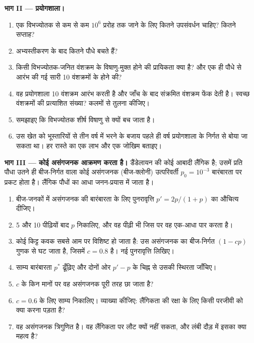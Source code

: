 \begin{problem}
\medskip
\noindent\textbf{भाग II --- प्रयोगशाला।}
\begin{enumerate}[resume]
  \item एक विभज्योतक से कम से कम $10^{6}$ प्ररोह तक जाने के लिए कितने
        उपसंवर्धन चाहिए? कितने सप्ताह?
  \item अभ्यस्तीकरण के बाद कितने पौधे बचते हैं?
  \item किसी विभज्योतक-जनित वंशक्रम के विषाणु-मुक्त होने की प्रायिकता
        क्या है? और एक ही पौधे से आरंभ की गई सारी \num{10} वंशक्रमों के
        होने की?
  \item वह प्रयोगशाला \num{10} वंशक्रम आरंभ करती है और जाँच के बाद
        संक्रमित वंशक्रम फेंक देती है। स्वच्छ वंशक्रमों की प्रत्याशित
        संख्या? कलमों से तुलना कीजिए।
  \item समझाइए कि विभज्योतक शीर्ष विषाणु से क्यों बच जाता है।
  \item उस खेत को भूस्तारियों से तीन वर्ष में भरने के बजाय पहले ही वर्ष
        प्रयोगशाला के निर्गत से बोया जा सकता था। हर रास्ते का एक लाभ
        और एक जोखिम बताइए।
\end{enumerate}

\medskip
\noindent\textbf{भाग III --- कोई असंगजनक आक्रमण करता है।}
डैंडेलायन की कोई आबादी लैंगिक है; उसमें प्रति पौधा उतने ही बीज-निर्गत
वाला कोई असंगजनक (बीज-क्लोनी) उत्परिवर्ती $p_0 = 10^{-3}$ बारंबारता पर
प्रकट होता है। लैंगिक पौधों का आधा जनन-प्रयास
 में जाता है।
\begin{enumerate}[resume]
  \item बीज-जनकों में असंगजनक की बारंबारता के लिए पुनरावृत्ति
        $p' = 2p/(1 + p)$ का औचित्य दीजिए।
  \item 5 और 10 पीढ़ियों बाद $p$ निकालिए, और वह पीढ़ी भी जिस पर वह
        एक-आधा पार करता है।
  \item कोई किट्ट कवक सबसे आम  पर विशिष्ट हो जाता है: उस
        असंगजनक का बीज-निर्गत $(1 - cp)$ गुणक से घट जाता है, जिसमें
        $c = 0.8$ है। नई पुनरावृत्ति लिखिए।
  \item साम्य बारंबारता $p^*$ ढूँढ़िए और दोनों ओर $p' - p$ के चिह्न से
        उसकी स्थिरता जाँचिए।
  \item $c$ के किन मानों पर वह असंगजनक पूरी तरह छा जाता है?
  \item $c = 0.6$ के लिए साम्य निकालिए। व्याख्या कीजिए: लैंगिकता की
        रक्षा के लिए किसी परजीवी को क्या करना पड़ता है?
  \item वह असंगजनक त्रिगुणित है। वह लैंगिकता पर लौट क्यों नहीं सकता,
        और लंबी दौड़ में इसका क्या महत्व है?
\end{enumerate}


\end{problem}
